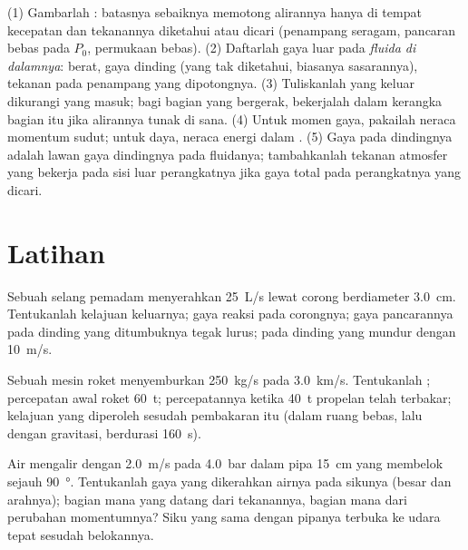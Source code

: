 \begin{method}\label{met:b2:flow-balances:method}
(1) Gambarlah : batasnya sebaiknya memotong alirannya hanya
di tempat kecepatan dan tekanannya diketahui atau dicari (penampang seragam,
pancaran bebas pada $P_0$, permukaan bebas). (2) Daftarlah gaya luar pada
\emph{fluida di dalamnya}: berat, gaya dinding (yang tak diketahui, biasanya sasarannya),
tekanan pada penampang yang dipotongnya. (3) Tuliskanlah  yang keluar dikurangi yang masuk;
bagi bagian yang bergerak, bekerjalah dalam kerangka bagian itu jika alirannya tunak
di sana. (4) Untuk momen gaya, pakailah neraca momentum sudut; untuk daya,
neraca energi dalam . (5) Gaya pada dindingnya adalah lawan gaya
dindingnya pada fluidanya; tambahkanlah tekanan atmosfer yang bekerja pada
sisi luar perangkatnya jika gaya total pada perangkatnya yang dicari.
\end{method}

\section{Latihan}

\begin{exercise}[$\star$]\label{exo:b2:flow-balances:1}
Sebuah selang pemadam menyerahkan \qty{25}{L/s} lewat corong berdiameter
\qty{3.0}{cm}. Tentukanlah kelajuan keluarnya; gaya reaksi pada corongnya; gaya pancarannya
pada dinding yang ditumbuknya tegak lurus; pada dinding yang mundur dengan \qty{10}{m/s}.
\end{exercise}

\begin{exercise}[$\star$]\label{exo:b2:flow-balances:2}
Sebuah mesin roket menyemburkan \qty{250}{kg/s} pada \qty{3.0}{km/s}. Tentukanlah ; percepatan
awal roket \qty{60}{t}; percepatannya ketika \qty{40}{t}
propelan telah terbakar; kelajuan yang diperoleh sesudah pembakaran itu (dalam ruang bebas, lalu
dengan gravitasi, berdurasi \qty{160}{s}).
\end{exercise}

\begin{exercise}[$\star$]\label{exo:b2:flow-balances:3}
Air mengalir dengan \qty{2.0}{m/s} pada \qty{4.0}{bar} dalam pipa \qty{15}{cm} yang
membelok sejauh \qty{90}{\degree}. Tentukanlah gaya yang dikerahkan airnya pada sikunya
(besar dan arahnya); bagian mana yang datang dari tekanannya, bagian mana
dari perubahan momentumnya? Siku yang sama dengan pipanya terbuka ke udara tepat
sesudah belokannya.
\end{exercise}

